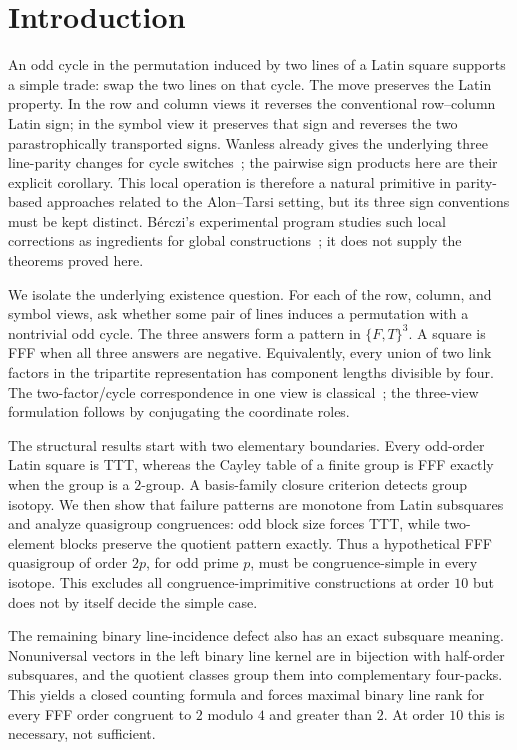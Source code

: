 \section{Introduction}

An odd cycle in the permutation induced by two lines of a Latin square
supports a simple trade: swap the two lines on that cycle.  The move preserves
the Latin property.  In the row and column views it reverses the conventional
row--column Latin sign; in the symbol view it preserves that sign and reverses
the two parastrophically transported signs. Wanless already gives the
underlying three line-parity changes for cycle
switches~\cite[Proposition~1]{Wanless2004CycleSwitches}; the pairwise sign
products here are their explicit corollary. This local operation is therefore
a natural primitive in parity-based approaches related to the Alon--Tarsi
setting, but its three sign conventions must be kept distinct.  B\'erczi's
experimental program studies such local corrections as ingredients for
global constructions~\cite{Berczi2026}; it does not supply the theorems proved
here.

We isolate the underlying existence question.  For each of the row, column,
and symbol views, ask whether some pair of lines induces a permutation with a
nontrivial odd cycle.  The three answers form a pattern in $\{F,T\}^3$.  A
square is FFF when all three answers are negative.  Equivalently, every union
of two link factors in the tripartite representation has component lengths
divisible by four. The two-factor/cycle correspondence in one view is
classical~\cite[Section~3]{WanlessIhrig2005Factorizations}; the three-view
formulation follows by conjugating the coordinate roles.

The structural results start with two elementary boundaries.  Every
odd-order Latin square is TTT, whereas the Cayley table of a finite group
is FFF exactly when the group is a
$2$-group.  A basis-family closure criterion detects group isotopy.  We then
show that failure patterns are monotone from Latin subsquares and analyze
quasigroup congruences: odd block size forces TTT, while two-element blocks
preserve the quotient pattern exactly.  Thus a hypothetical FFF quasigroup of
order $2p$, for odd prime $p$, must be congruence-simple in every isotope.
This excludes all congruence-imprimitive constructions at order $10$ but does
not by itself decide the simple case.

The remaining binary line-incidence defect also has an exact subsquare
meaning.  Nonuniversal vectors in the left binary line kernel are in
bijection with half-order subsquares, and the quotient classes group them
into complementary four-packs.  This yields a closed counting formula and
forces maximal binary line rank for every FFF order congruent to $2$ modulo
$4$ and greater than $2$.  At order $10$ this is necessary, not sufficient.

